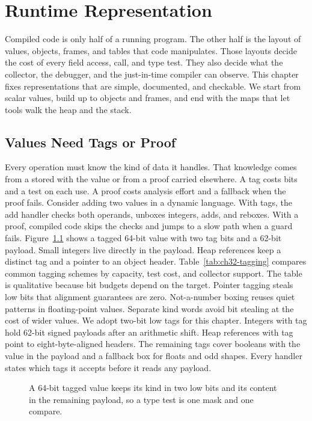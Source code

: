 \chapter{Runtime Representation}\label{ch:runtime-representation}

Compiled code is only half of a running program.
The other half is the layout of values, objects, frames, and tables that code manipulates.
Those layouts decide the cost of every field access, call, and type test.
They also decide what the collector, the debugger, and the just-in-time compiler can observe.
This chapter fixes representations that are simple, documented, and checkable.
We start from scalar values, build up to objects and frames, and end with the maps that let tools walk the heap and the stack.

\section{Values Need Tags or Proof}\label{sec:ch32-values}

Every operation must know the kind of data it handles.
That knowledge comes from a  stored with the value or from a proof carried elsewhere.
A tag costs bits and a test on each use.
A proof costs analysis effort and a fallback when the proof fails.
Consider adding two values in a dynamic language.
With tags, the add handler checks both operands, unboxes integers, adds, and reboxes.
With a proof, compiled code skips the checks and jumps to a slow path when a guard fails.
Figure~\ref{fig:ch32-tagged-value} shows a tagged 64-bit value with two tag bits and a 62-bit payload.
Small integers live directly in the payload.
Heap references keep a distinct tag and a pointer to an object header.
Table~\ref{tab:ch32-tagging} compares common tagging schemes by capacity, test cost, and collector support.
The table is qualitative because bit budgets depend on the target.
Pointer tagging steals low bits that alignment guarantees are zero.
Not-a-number boxing reuses quiet patterns in floating-point values.
Separate kind words avoid bit stealing at the cost of wider values.
We adopt two-bit low tags for this chapter.
Integers with tag  hold 62-bit signed payloads after an arithmetic shift.
Heap references with tag  point to eight-byte-aligned headers.
The remaining tags cover booleans with the value in the payload and a fallback box for floats and odd shapes.
Every handler states which tags it accepts before it reads any payload.

\begin{figure}[htbp]
\centering
{}
\caption{A 64-bit tagged value keeps its kind in two low bits and its content in the remaining payload, so a type test is one mask and one compare.}
\label{fig:ch32-tagged-value}
\end{figure}

